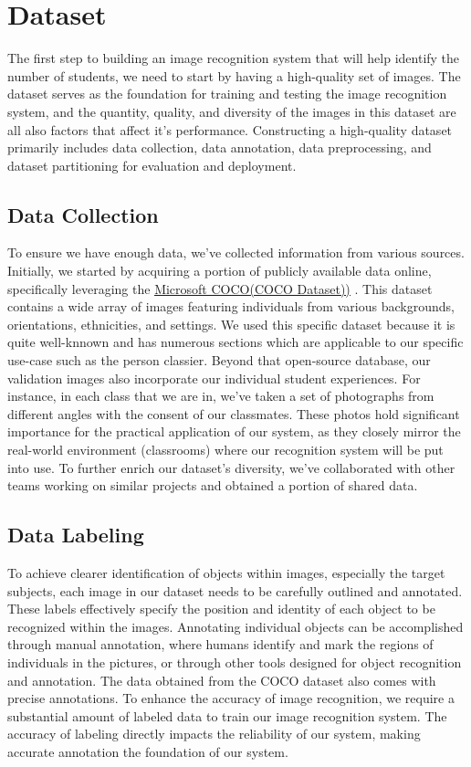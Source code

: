 \section{Dataset}
The first step to building an image recognition system that will help identify the number of students, we need to start by having a high-quality set of images. The dataset serves as the foundation for training and testing the image recognition system, and the quantity, quality, and diversity of the images in this dataset are all also factors that affect it's performance. Constructing a high-quality dataset primarily includes data collection, data annotation, data preprocessing, and dataset partitioning for evaluation and deployment.\\
\label{sec:method}
\subsection{Data Collection}
\label{subsec:method}
To ensure we have enough data, we've collected information from various sources. Initially, we started by acquiring a portion of publicly available data online, specifically leveraging the \href{https://cocodataset.org/#home}{\underline{Microsoft COCO(COCO Dataset))}} \cite{YOLOpaper3}. This dataset contains a wide array of images featuring individuals from various backgrounds, orientations, ethnicities, and settings. We used this specific dataset because it is quite well-knnown and has numerous sections which are applicable to our specific use-case such as the person classier. Beyond that open-source database, our validation images also incorporate our individual student experiences. For instance, in each class that we are in, we've taken a set of photographs from different angles with the consent of our classmates. These photos hold significant importance for the practical application of our system, as they closely mirror the real-world environment (classrooms) where our recognition system will be put into use. To further enrich our dataset's diversity, we've collaborated with other teams working on similar projects and obtained a portion of shared data.\\
\label{sec:method}
\subsection{Data Labeling}
\label{subsec:method}
To achieve clearer identification of objects within images, especially the target subjects, each image in our dataset needs to be carefully outlined and annotated. These labels effectively specify the position and identity of each object to be recognized within the images. Annotating individual objects can be accomplished through manual annotation, where humans identify and mark the regions of individuals in the pictures, or through other tools designed for object recognition and annotation. The data obtained from the COCO dataset also comes with precise annotations. To enhance the accuracy of image recognition, we require a substantial amount of labeled data to train our image recognition system. The accuracy of labeling directly impacts the reliability of our system, making accurate annotation the foundation of our system.\\
\label{sec:method}
